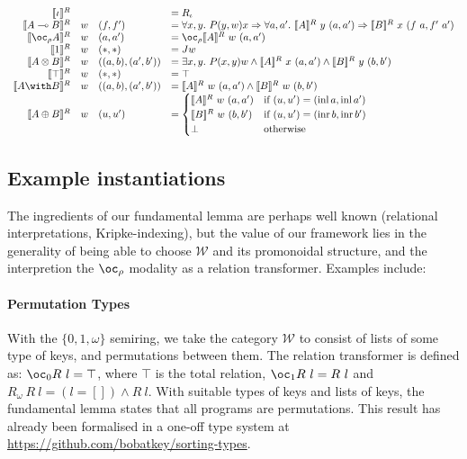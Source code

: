 \begin{displaymath}
  \begin{array}{rlll}
    \sem{\base}^R && &= R_\base \\
    \sem{\fun{A}{B}}^R & w & (f,f') &= \forall x,y.~P(y,w)x \Rightarrow \forall
    a,a'.~\sem{A}^R~y~(a,a') \Rightarrow \sem{B}^R~x~(f~a,f'~a') \\
    \sem{\excl{\rho}{A}}^R & w & (a,a') &= \oc_\rho \sem{A}^R~w~(a,a') \\
    \sem{\tensorOne}^R & w & (*,*) &= Jw \\
    \sem{\tensor{A}{B}}^R & w & ((a,b),(a',b')) &= \exists x,y.~P(x,y)w \wedge
    \sem{A}^R~x~(a,a') \wedge \sem{B}^R~y~(b,b') \\
    \sem{\withTOne}^R & w & (*,*) &= \top \\
    \sem{\withT{A}{B}}^R & w & ((a,b),(a',b')) &=
    \sem{A}^R~w~(a,a') \wedge \sem{B}^R~w~(b,b') \\
    \sem{\sumT{A}{B}}^R & w & (u,u') &=
    \begin{cases}
      \sem{A}^R~w~(a,a') & \text{if } (u,u') = (\operatorname{inl} a,
                           \operatorname{inl} a') \\
      \sem{B}^R~w~(b,b') & \text{if } (u,u') = (\operatorname{inr} b,
                           \operatorname{inr} b') \\
      \bot & \text{otherwise}
    \end{cases}
  \end{array}
\end{displaymath}

\subsection{Example instantiations}
The ingredients of our fundamental lemma are perhaps well known
(relational interpretations, Kripke-indexing), but the value of our
framework lies in the generality of being able to choose $\mathcal{W}$
and its promonoidal structure, and the interpretion the $\oc_\rho$
modality as a relation transformer. Examples include:

\paragraph{Permutation Types} With the $\{0,1,\omega\}$ semiring, we
take the category $\mathcal{W}$ to consist of lists of some type of
keys, and permutations between them. The relation transformer is
defined as: $\oc_0 R~l = \top$, where $\top$ is the total relation,
$\oc_1 R~l = R~l$ and $R_\omega~R~l = (l = []) \land R~l$. With
suitable types of keys and lists of keys, the fundamental lemma states
that all programs are permutations. This result has already been
formalised in a one-off type system at
\url{https://github.com/bobatkey/sorting-types}.

